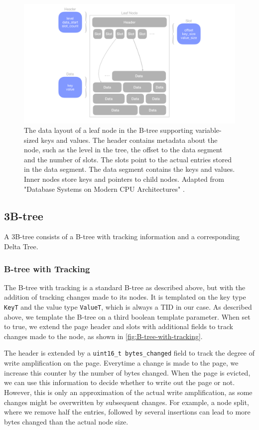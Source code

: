 \begin{figure}[htbp]
  \centering
  \includegraphics[width=1\textwidth]{figures/leaf_node.pdf}
  \caption{The data layout of a leaf node in the B-tree supporting variable-sized keys and values. The header contains metadata about the node, such as the level in the tree, the offset to the data segment and the number of slots. The slots point to the actual entries stored in the data segment. The data segment contains the keys and values. Inner nodes store keys and pointers to child nodes. Adapted from "Database Systems on Modern CPU Architectures" \autocite{mdbs2024slides}.}
  \label{fig:leaf-node}
\end{figure}

\subsection*{3B-tree}

A 3B-tree consists of a B-tree with tracking information and a corresponding Delta Tree.

\subsubsection*{B-tree with Tracking}
The B-tree with tracking is a standard B-tree as described above, but with the addition of tracking changes made to its nodes.
It is templated on the key type \texttt{KeyT} and the value type \texttt{ValueT}, which is always a \ac{TID} in our case.
As described above, we template the B-tree on a third boolean template parameter.
When set to true, we extend the page header and slots with additional fields to track changes made to the node, as shown in \autoref{fig:B-tree-with-tracking}.

The header is extended by a \texttt{uint16\_t bytes\_changed} field to track the degree of write amplification on the page.
Everytime a change is made to the page, we increase this counter by the number of bytes changed.
When the page is evicted, we can use this information to decide whether to write out the page or not.
However, this is only an approximation of the actual write amplification, as some changes might be overwritten by subsequent changes.
For example, a node split, where we remove half the entries, followed by several insertions can lead to more bytes changed than the actual node size.

